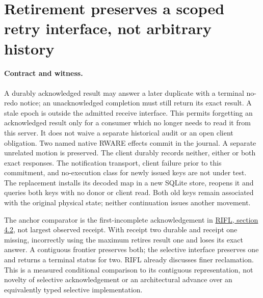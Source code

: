 \documentclass{article}
\begin{document}
\section*{Retirement preserves a scoped retry interface, not arbitrary history}
\paragraph{Contract and witness.}
A durably acknowledged result may answer a later duplicate with a
terminal no-redo notice; an unacknowledged completion must still return
its exact result. A stale epoch is outside the admitted receive interface.
This permits forgetting an acknowledged result only for a consumer
which no longer needs to read it from this server. It does not waive
a separate historical audit or an open client obligation.
Two named native RWARE effects commit in the journal. A separate
unrelated motion is preserved. The client durably records neither,
either or both exact responses. The notification transport, client
failure prior to this commitment, and no-execution class for newly
issued keys are not under test. The replacement installs its decoded
map in a new SQLite store, reopens it and queries both keys with no
donor or client read. Both old keys remain associated with the original
physical state; neither continuation issues another movement.

The anchor comparator is the first-incomplete acknowledgement in
\href{https://web.stanford.edu/~ouster/cgi-bin/papers/rifl.pdf}{RIFL, section 4.2},
not largest observed receipt. With receipt two durable and receipt one
missing, incorrectly using the maximum retires result one and loses
its exact answer. A contiguous frontier preserves both; the selective
interface preserves one and returns a terminal status for two. RIFL
already discusses finer reclamation. This is a measured conditional
comparison to its contiguous representation, not novelty of selective
acknowledgement or an architectural advance over an equivalently
typed selective implementation.
\end{document}
